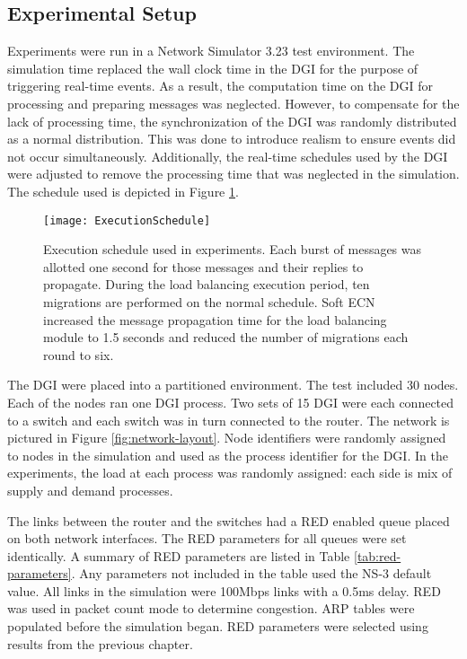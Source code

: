 \subsection{Experimental Setup}
\label{sect:experimentalsetup}

Experiments were run in a Network Simulator 3.23\cite{NS3} test environment.
The simulation time replaced the wall clock time in the \ac{DGI} for the purpose of triggering real-time events.
As a result, the computation time on the \ac{DGI} for processing and preparing messages was neglected.
However, to compensate for the lack of processing time, the synchronization of the \ac{DGI} was randomly distributed as a normal distribution.
This was done to introduce realism to ensure events did not occur simultaneously.
Additionally, the real-time schedules used by the \ac{DGI} were adjusted to remove the processing time that was neglected in the simulation.
The schedule used is depicted in Figure \ref{fig:execution-schedule}.

\begin{figure}
\centering
\texttt{[image: ExecutionSchedule]}
\caption[Execution schedule used in experiments.]{Execution schedule used in experiments. Each burst of messages was allotted one second for those messages and their replies to propagate. During the load balancing execution period, ten migrations are performed on the normal schedule. Soft ECN increased the message propagation time for the load balancing module to 1.5 seconds and reduced the number of migrations each round to six.}
\label{fig:execution-schedule}
\end{figure}

The \ac{DGI} were placed into a partitioned environment.
The test included 30 nodes.
Each of the nodes ran one \ac{DGI} process.
Two sets of 15 \ac{DGI} were each connected to a switch and each switch was in turn connected to the router.
The network is pictured in Figure \ref{fig:network-layout}.
Node identifiers were randomly assigned to nodes in the simulation and used as the process identifier for the \ac{DGI}.
In the experiments, the load at each process was randomly assigned: each side is mix of supply and demand processes.

The links between the router and the switches had a \ac{RED} enabled queue placed on both network interfaces.
The \ac{RED} parameters for all queues were set identically.
A summary of \ac{RED} parameters are listed in Table \ref{tab:red-parameters}.
Any parameters not included in the table used the NS-3 default value.
All links in the simulation were 100Mbps links with a 0.5ms delay.
RED was used in packet count mode to determine congestion.
ARP tables were populated before the simulation began.
\ac{RED} parameters were selected using results from the previous chapter.

